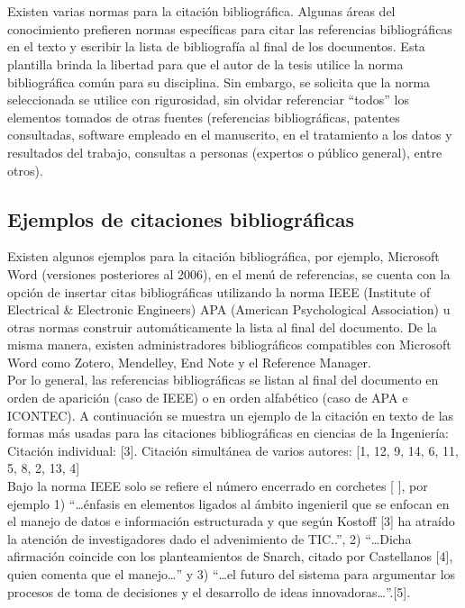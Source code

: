 \chapter{}

Existen varias normas para la citación bibliográfica. Algunas áreas del conocimiento prefieren normas específicas para citar las referencias bibliográficas en el texto y escribir la lista de bibliografía al final de los documentos. Esta plantilla brinda la libertad para que el autor de la tesis utilice la norma bibliográfica común para su disciplina. Sin embargo, se solicita que la norma seleccionada se utilice con rigurosidad, sin olvidar referenciar “todos” los elementos tomados de otras fuentes (referencias bibliográficas, patentes consultadas, software empleado en el manuscrito, en el tratamiento a los datos y resultados del trabajo, consultas a personas (expertos o público general), entre otros).

\section{Ejemplos de citaciones bibliográficas}

Existen algunos ejemplos para la citación bibliográfica, por ejemplo, Microsoft Word (versiones posteriores al 2006), en el  menú de referencias, se cuenta con la opción de insertar citas bibliográficas utilizando la norma IEEE (Institute of Electrical \& Electronic Engineers) APA (American Psychological Association) u otras normas construir automáticamente la lista al final del documento. De la misma manera, existen administradores bibliográficos compatibles con Microsoft Word como Zotero, Mendelley, End Note y el Reference Manager. \\

Por lo general, las referencias bibliográficas se listan al final del documento en orden de aparición (caso de IEEE) o en orden alfabético (caso de APA e ICONTEC). 
A continuación se muestra un ejemplo de la citación en texto de las formas más usadas para las citaciones bibliográficas en ciencias de la Ingeniería: \\

Citación individual: [3].
Citación simultánea de varios autores: [1, 12, 9, 14, 6, 11, 5, 8, 2, 13, 4]\\

Bajo la norma IEEE solo se refiere el número  encerrado en corchetes  [  ], por ejemplo 1) “…énfasis en elementos ligados al ámbito ingenieril que se enfocan en el manejo de datos e información estructurada y que según Kostoff [3] ha atraído la atención de investigadores dado el advenimiento de TIC..”, 2) “…Dicha afirmación coincide con los planteamientos de Snarch, citado por Castellanos [4], quien comenta que el manejo…” y 3)  “…el futuro del sistema para argumentar los procesos de toma de decisiones y el desarrollo de ideas innovadoras…”.[5].

